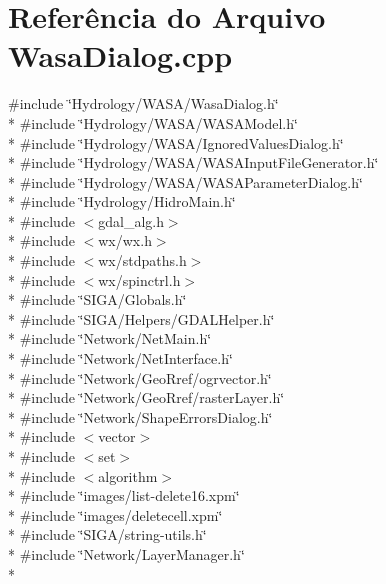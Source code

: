\section{Referência do Arquivo Wasa\+Dialog.\+cpp}
\label{_wasa_dialog_8cpp}
{\ttfamily \#include \char`\"{}Hydrology/\+W\+A\+S\+A/\+Wasa\+Dialog.\+h\char`\"{}}\\*
{\ttfamily \#include \char`\"{}Hydrology/\+W\+A\+S\+A/\+W\+A\+S\+A\+Model.\+h\char`\"{}}\\*
{\ttfamily \#include \char`\"{}Hydrology/\+W\+A\+S\+A/\+Ignored\+Values\+Dialog.\+h\char`\"{}}\\*
{\ttfamily \#include \char`\"{}Hydrology/\+W\+A\+S\+A/\+W\+A\+S\+A\+Input\+File\+Generator.\+h\char`\"{}}\\*
{\ttfamily \#include \char`\"{}Hydrology/\+W\+A\+S\+A/\+W\+A\+S\+A\+Parameter\+Dialog.\+h\char`\"{}}\\*
{\ttfamily \#include \char`\"{}Hydrology/\+Hidro\+Main.\+h\char`\"{}}\\*
{\ttfamily \#include $<$gdal\+\_\+alg.\+h$>$}\\*
{\ttfamily \#include $<$wx/wx.\+h$>$}\\*
{\ttfamily \#include $<$wx/stdpaths.\+h$>$}\\*
{\ttfamily \#include $<$wx/spinctrl.\+h$>$}\\*
{\ttfamily \#include \char`\"{}S\+I\+G\+A/\+Globals.\+h\char`\"{}}\\*
{\ttfamily \#include \char`\"{}S\+I\+G\+A/\+Helpers/\+G\+D\+A\+L\+Helper.\+h\char`\"{}}\\*
{\ttfamily \#include \char`\"{}Network/\+Net\+Main.\+h\char`\"{}}\\*
{\ttfamily \#include \char`\"{}Network/\+Net\+Interface.\+h\char`\"{}}\\*
{\ttfamily \#include \char`\"{}Network/\+Geo\+Rref/ogrvector.\+h\char`\"{}}\\*
{\ttfamily \#include \char`\"{}Network/\+Geo\+Rref/raster\+Layer.\+h\char`\"{}}\\*
{\ttfamily \#include \char`\"{}Network/\+Shape\+Errors\+Dialog.\+h\char`\"{}}\\*
{\ttfamily \#include $<$vector$>$}\\*
{\ttfamily \#include $<$set$>$}\\*
{\ttfamily \#include $<$algorithm$>$}\\*
{\ttfamily \#include \char`\"{}images/list-\/delete16.\+xpm\char`\"{}}\\*
{\ttfamily \#include \char`\"{}images/deletecell.\+xpm\char`\"{}}\\*
{\ttfamily \#include \char`\"{}S\+I\+G\+A/string-\/utils.\+h\char`\"{}}\\*
{\ttfamily \#include \char`\"{}Network/\+Layer\+Manager.\+h\char`\"{}}\\*
